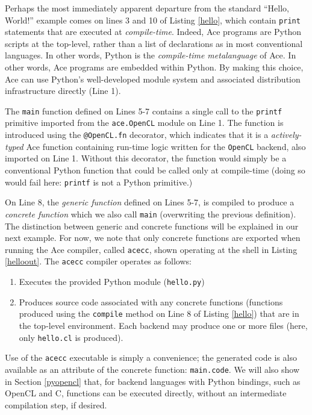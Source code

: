 \documentclass[10pt, conference, compsocconf]{IEEEtran}
\begin{document}
Perhaps the most immediately apparent departure from the standard ``Hello, World!'' example comes on lines 3 and 10 of Listing \ref{hello}, which contain \verb|print| statements that are executed at {\em compile-time}. Indeed, Ace programs are Python scripts at the top-level, rather than a list of declarations as in most conventional languages. In other words, Python is the {\em compile-time metalanguage} of Ace. In other words, Ace programs are embedded within Python. By making this choice, Ace can  use Python's well-developed module system and associated distribution infrastructure directly (Line 1). 

The \verb|main| function defined on Lines 5-7 contains a single call to the \verb|printf| primitive imported from the \verb|ace.OpenCL| module on Line 1. The function is introduced using the \verb|@OpenCL.fn| decorator, which indicates that it is a {\em actively-typed} Ace function containing run-time logic written for the \verb|OpenCL| backend, also imported on Line 1. Without this decorator, the function would simply be a conventional Python function that could be called only at compile-time (doing so would fail here: \verb|printf| is not a Python primitive.)

On Line 8, the {\em generic function} defined on Lines 5-7, is compiled to produce a {\em concrete function} which we also call \verb|main| (overwriting the previous definition). The distinction between generic and concrete functions will be explained in our next example. For now, we note that only concrete functions are exported when running the Ace compiler, called \verb|acecc|, shown operating at the shell in Listing \ref{helloout}. The \verb|acecc| compiler operates as follows:
\begin{enumerate}
\item Executes the provided Python module (\verb|hello.py|)
\item Produces source code associated with any concrete functions (functions produced using the \verb|compile| method on Line 8 of Listing \ref{hello}) that are in the top-level environment. Each backend may produce one or more files (here, only \verb|hello.cl| is produced).
\end{enumerate}

Use of the \verb|acecc| executable is simply a convenience; the generated code is also available as an attribute of the concrete function: \verb|main.code|. We will also show in Section \ref{pyopencl} that, for backend languages with Python bindings, such as OpenCL and C, functions can be executed directly, without an intermediate compilation step, if desired.
\end{document}
